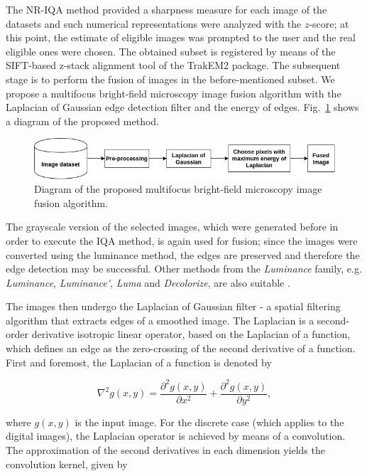 The NR-IQA method provided a sharpness measure for each image of the datasets and such numerical representations were analyzed with the $z$-score; at this point, the estimate of eligible images was prompted to the user and the real eligible ones were chosen. The obtained subset is registered by means of the SIFT-based z-stack alignment tool of the TrakEM2 package. The subsequent stage is to perform the fusion of images in the before-mentioned subset. We propose a multifocus bright-field microscopy image fusion algorithm with the Laplacian of Gaussian edge detection filter and the energy of edges. Fig.~\ref{fig:fusion_pipeline} shows a diagram of the proposed method.

\begin{figure}[ht]
    \centering
    \caption{Diagram of the proposed multifocus bright-field microscopy image fusion algorithm.}
    \label{fig:fusion_pipeline}
    \includegraphics[scale=0.65]{images/fusion_pipeline.png}
    \centering
    \fautor
\end{figure}

The grayscale version of the selected images, which were generated before in order to execute the IQA method, is again used for fusion; since the images were converted using the luminance method, the edges are preserved and therefore the edge detection may be successful. Other methods from the \emph{Luminance} family, e.g. \emph{Luminance}, \emph{Luminance\'}, \emph{Luma} and \emph{Decolorize}, are also suitable \cite{kanan2012color}.

The images then undergo the Laplacian of Gaussian filter - a spatial filtering algorithm that extracts edges of a smoothed image. The Laplacian is a second-order derivative isotropic linear operator, based on the Laplacian of a function, which defines an edge as the zero-crossing of the second derivative of a function. First and foremost, the Laplacian of a function is denoted by

\begin{equation}
\label{eqn:laplacian_of_function}
\nabla^{2}g(x,y) = \frac{\partial^{2} g(x,y)}{\partial x^{2}}
                    +
                  \frac{\partial^{2} g(x,y)}{\partial y^{2}},
\end{equation}

\noindent where $g(x,y)$ is the input image. For the discrete case (which applies to the digital images), the Laplacian operator is achieved by means of a convolution. The approximation of the second derivatives in each dimension yields the convolution kernel, given by

